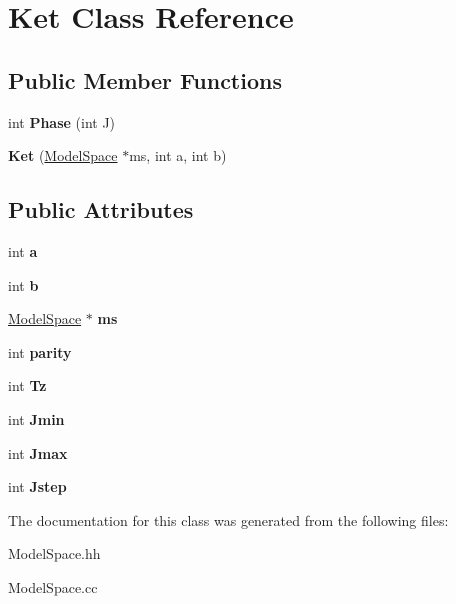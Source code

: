 \hypertarget{classKet}{\section{Ket Class Reference}
\label{classKet}
}
\subsection*{Public Member Functions}
\begin{DoxyCompactItemize}
\item 
\hypertarget{classKet_ac07bfbc7c7f2bdf77341ba6d54036e8e}{int {\bfseries Phase} (int J)}\label{classKet_ac07bfbc7c7f2bdf77341ba6d54036e8e}

\item 
\hypertarget{classKet_a78e1cc2338f47e1977e550aaa3720dca}{{\bfseries Ket} (\hyperlink{classModelSpace}{Model\-Space} $\ast$ms, int a, int b)}\label{classKet_a78e1cc2338f47e1977e550aaa3720dca}

\end{DoxyCompactItemize}
\subsection*{Public Attributes}
\begin{DoxyCompactItemize}
\item 
\hypertarget{classKet_a6e8e3806e54a08840541765b2979c228}{int {\bfseries a}}\label{classKet_a6e8e3806e54a08840541765b2979c228}

\item 
\hypertarget{classKet_a92aa032ed2b805744542622392ba91e6}{int {\bfseries b}}\label{classKet_a92aa032ed2b805744542622392ba91e6}

\item 
\hypertarget{classKet_ab9e32bf8c16c7ce422e9a1c9ffe2a9fd}{\hyperlink{classModelSpace}{Model\-Space} $\ast$ {\bfseries ms}}\label{classKet_ab9e32bf8c16c7ce422e9a1c9ffe2a9fd}

\item 
\hypertarget{classKet_a4a0681d5510440adda8a1b8381cf9152}{int {\bfseries parity}}\label{classKet_a4a0681d5510440adda8a1b8381cf9152}

\item 
\hypertarget{classKet_ab5dfa76647fc103d1c97ae349a6353e7}{int {\bfseries Tz}}\label{classKet_ab5dfa76647fc103d1c97ae349a6353e7}

\item 
\hypertarget{classKet_ae042513fd7d35c7edd185d86ef961a00}{int {\bfseries Jmin}}\label{classKet_ae042513fd7d35c7edd185d86ef961a00}

\item 
\hypertarget{classKet_a9ef8bcb06beb06198fc12d194e7a379e}{int {\bfseries Jmax}}\label{classKet_a9ef8bcb06beb06198fc12d194e7a379e}

\item 
\hypertarget{classKet_a81376ef212f38628ad2aa913825052f3}{int {\bfseries Jstep}}\label{classKet_a81376ef212f38628ad2aa913825052f3}

\end{DoxyCompactItemize}


The documentation for this class was generated from the following files\-:\begin{DoxyCompactItemize}
\item 
Model\-Space.\-hh\item 
Model\-Space.\-cc\end{DoxyCompactItemize}
